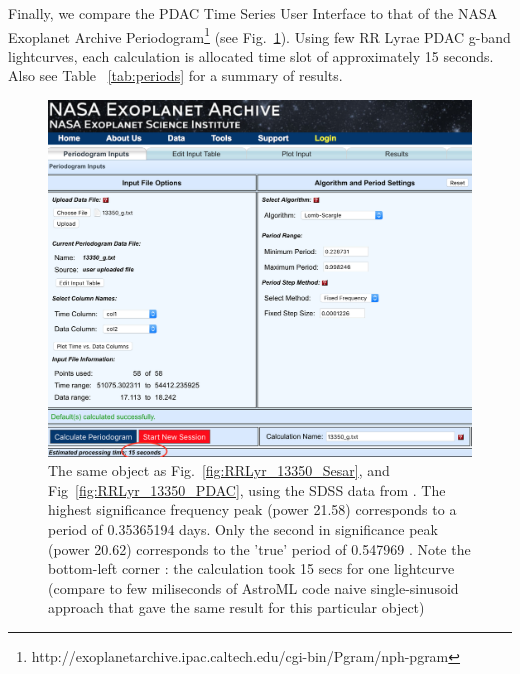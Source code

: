 \documentclass[DM,lsstdraft,toc,usenatbib]{lsstdoc}
\begin{document}
Finally, we compare the PDAC Time Series User Interface to that of the  NASA Exoplanet Archive Periodogram\footnote{http://exoplanetarchive.ipac.caltech.edu/cgi-bin/Pgram/nph-pgram} (see Fig.~\ref{fig:exoplanet_archive}). Using few RR Lyrae PDAC g-band  lightcurves, each calculation is allocated time slot of approximately 15 seconds. Also see Table ~\ref{tab:periods} for a summary of results. 

\begin{figure}
\includegraphics[width=\textwidth]{figs/Exoplanet_archive_periodogram}
\caption{ The same object as Fig.~\ref{fig:RRLyr_13350_Sesar}, and Fig~\ref{fig:RRLyr_13350_PDAC},  using  the SDSS data from \citep{sesar2010}.  The highest significance frequency peak (power 21.58) corresponds to  a period of 0.35365194 days. Only the second in significance peak (power 20.62) corresponds to the 'true' period of 0.547969 \citep{sesar2010}. Note the bottom-left corner : the calculation took 15 secs for one lightcurve (compare to few miliseconds of AstroML code naive single-sinusoid approach that gave the same result for this particular object) }
\label{fig:exoplanet_archive}
\end{figure}



\end{document}
